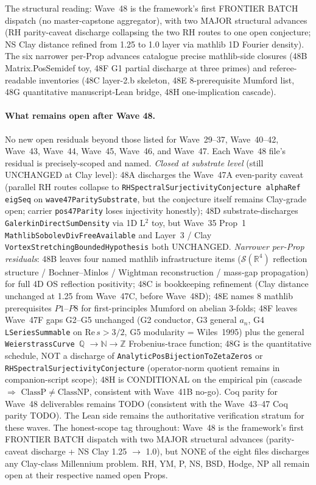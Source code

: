 The structural reading: Wave~48 is the framework's first
FRONTIER BATCH dispatch (no master-capstone aggregator), with two
MAJOR structural advances (RH parity-caveat discharge collapsing
the two RH routes to one open conjecture; NS Clay distance refined
from 1.25 to 1.0 layer via mathlib 1D Fourier density). The six
narrower per-Prop advances catalogue precise mathlib-side closures
(48B Matrix.PosSemidef toy, 48F G1 partial discharge at three
primes) and referee-readable inventories (48C layer-2.b skeleton,
48E 8-prerequisite Mumford list, 48G quantitative manuscript-Lean
bridge, 48H one-implication cascade).

\paragraph{What remains open after Wave 48.} No new open residuals
beyond those listed for Wave~29--37, Wave~40--42, Wave~43,
Wave~44, Wave~45, Wave~46, and Wave~47. Each Wave~48 file's
residual is precisely-scoped and named. \emph{Closed at substrate
level} (still UNCHANGED at Clay level): 48A discharges the
Wave~47A even-parity caveat (parallel RH routes collapse to
\texttt{RHSpectralSurjectivityConjecture alphaRef eigSeq} on
\texttt{wave47ParitySubstrate}, but the conjecture itself remains
Clay-grade open; carrier \texttt{pos47Parity} loses injectivity
honestly); 48D substrate-discharges
\texttt{GalerkinDirectSumDensity} via 1D L$^2$ toy, but Wave~35
Prop~1 \texttt{MathlibSobolevDivFreeAvailable} and Layer~3 /
Clay \texttt{VortexStretchingBoundedHypothesis} both UNCHANGED.
\emph{Narrower per-Prop residuals}: 48B leaves four named mathlib
infrastructure items ($\mathcal{S}(\mathbb{R}^4)$ reflection
structure / Bochner--Minlos / Wightman reconstruction / mass-gap
propagation) for full 4D OS reflection positivity; 48C is
bookkeeping refinement (Clay distance unchanged at 1.25 from
Wave~47C, before Wave~48D); 48E names 8 mathlib prerequisites
$P1$--$P8$ for first-principles Mumford on abelian 3-folds; 48F
leaves Wave~47F gaps G2--G5 unchanged (G2 conductor, G3 general
$a_n$, G4 \texttt{LSeriesSummable} on $\mathrm{Re}\,s > 3/2$, G5
modularity = Wiles~1995) plus the general
\texttt{WeierstrassCurve $\mathbb{Q}$} $\to \mathbb{N} \to \mathbb{Z}$
Frobenius-trace function; 48G is the quantitative schedule, NOT
a discharge of \texttt{AnalyticPosBijectionToZetaZeros} or
\texttt{RHSpectralSurjectivityConjecture} (operator-norm quotient
remains in companion-script scope); 48H is CONDITIONAL on the
empirical pin (cascade $\Rightarrow$
$\mathrm{ClassP} \neq \mathrm{ClassNP}$, consistent with Wave~41B
no-go). Coq parity for Wave~48 deliverables remains TODO
(consistent with the Wave~43--47 Coq parity TODO). The Lean side
remains the authoritative verification stratum for these waves.
The honest-scope tag throughout: Wave~48 is the framework's first
FRONTIER BATCH dispatch with two MAJOR structural advances
(parity-caveat discharge + NS Clay 1.25 $\to$ 1.0), but NONE of
the eight files discharges any Clay-class Millennium problem. RH,
YM, P, NS, BSD, Hodge, NP all remain open at their respective
named open Props.

